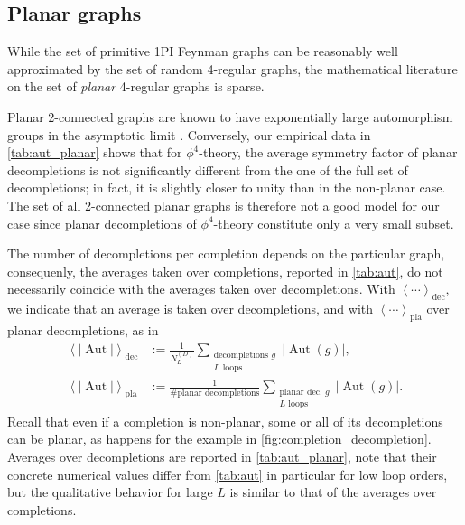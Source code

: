 \documentclass[11pt,a4paper]{article}
\newcommand{\abs}[1]{\lvert #1 \rvert}
\newcommand{\Aut}{\operatorname{Aut}}
\renewcommand{\|}{\rule[-0.4ex]{0.2ex}{1.2em}}
\begin{document}
\FloatBarrier

\subsection{Planar graphs}\label{sec:planar_graphs}

While the set of primitive 1PI Feynman graphs can be reasonably well approximated by the set of random 4-regular graphs, the mathematical literature on the set of \emph{planar} 4-regular graphs is sparse. 

Planar 2-connected graphs are known to have exponentially large automorphism groups in the asymptotic limit  \cite{bender_number_2002}. Conversely, our empirical  data  in \cref{tab:aut_planar} shows that for $\phi^4$-theory, the average symmetry factor of planar decompletions  is not significantly different from the one of the full set of decompletions; in fact, it is slightly closer to unity than in the non-planar case. The set of all 2-connected planar graphs is therefore not a good model for our case since planar decompletions of $\phi^4$-theory constitute only a very small subset.



The number of decompletions per completion depends on the particular graph, consequenly, the averages taken over   completions, reported in \cref{tab:aut}, do not necessarily coincide with the averages taken over decompletions. With $\left \langle  \cdots \right \rangle _\text{dec}$, we indicate that an average is taken over decompletions,  and with $\left \langle \cdots \right \rangle _{\text{pla}}$  over planar decompletions, as in 
\begin{align} \label{def:mean_dec}
	\left \langle \abs{\Aut}    \right \rangle _\text{dec} &:= \frac{1}{  N^{(D)}_L  } \sum_{\substack{ \text{decompletions }g \\ L \text{ loops} }}  \abs{\Aut(g)} ,  \\
	\left \langle  \abs{\Aut } \right \rangle _\text{pla} &:= \frac{1}{  \# \text{planar decompletions} } \sum_{\substack{ \text{planar dec. }g \\ L \text{ loops} }}  \abs{\Aut (g)}. \nonumber
\end{align}
Recall that even if a completion is non-planar, some or all of its decompletions can be planar, as happens for the example in  \cref{fig:completion_decompletion}. 
Averages over decompletions are reported in \cref{tab:aut_planar}, note that their concrete numerical values differ from \cref{tab:aut} in particular for low loop orders, but the qualitative behavior for large $L$ is similar to that of the averages over completions. 
\end{document}
